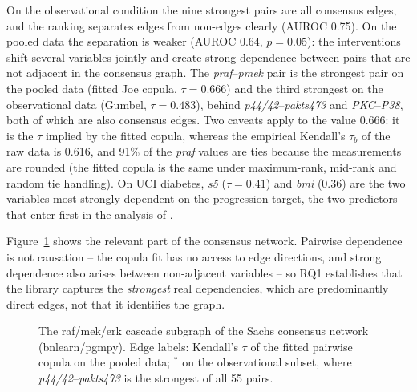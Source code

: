 \documentclass[
  english,
  class=report,
  accentcolor=2c,
  marginpar=false,
  parskip=half-,
  fontsize=11pt,
  ruledheaders=false,
  pdfa=false,
  IMRAD=false,
  thesis={type=master}
]{tudapub}
\begin{document}
On the observational condition the nine strongest pairs are all consensus
edges, and the ranking separates edges from non-edges clearly (AUROC 0.75).
On the pooled data the separation is weaker (AUROC 0.64, $p = 0.05$): the
interventions shift several variables jointly and create strong dependence
between pairs that are not adjacent in the consensus graph. The
\emph{praf}--\emph{pmek} pair is the strongest pair on the pooled data
(fitted Joe copula, $\tau = 0.666$) and the third strongest on the
observational data (Gumbel, $\tau = 0.483$), behind
\emph{p44/42}--\emph{pakts473} and \emph{PKC}--\emph{P38}, both of which are
also consensus edges. Two caveats apply to the value 0.666: it is the
$\tau$ implied by the fitted copula, whereas the empirical Kendall's
$\tau_b$ of the raw data is 0.616, and 91\% of the \emph{praf} values are
ties because the measurements are rounded (the fitted copula is the same
under maximum-rank, mid-rank and random tie handling). On UCI diabetes,
\emph{s5} ($\tau = 0.41$) and \emph{bmi} ($0.36$) are the two variables most
strongly dependent on the progression target, the two predictors that
enter first in the analysis of \textcite{efron2004}.

Figure~\ref{fig:sachs-cascade} shows the relevant part of the consensus
network. Pairwise dependence is not causation -- the copula fit has no
access to edge directions, and strong dependence also arises between
non-adjacent variables -- so RQ1 establishes that the library captures the
\emph{strongest} real dependencies, which are predominantly direct edges,
not that it identifies the graph.

\begin{figure}[ht]
\centering
{}
\caption{The raf/mek/erk cascade subgraph of the Sachs consensus network
(bnlearn/pgmpy). Edge labels: Kendall's $\tau$ of the fitted pairwise
copula on the pooled data; $^{*}$ on the observational subset, where
\emph{p44/42}--\emph{pakts473} is the strongest of all 55 pairs.}
\label{fig:sachs-cascade}
\end{figure}
\end{document}
